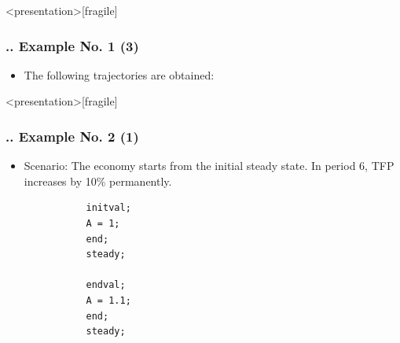 \documentclass[11pt,aspectratio=169]{beamer}
\begin{document}
\begin{frame}<presentation>[fragile]
	\frametitle{{\thesection.\thesubsection.\thesubsubsection} Example No. 1 (3)}
	\begin{itemize}
		\item The following trajectories are obtained:
		\begin{figure}
			\centering
			\qquad
			\qquad
		\end{figure}
	\end{itemize}
\end{frame}
\begin{frame}<presentation>[fragile]
	\frametitle{{\thesection.\thesubsection.\thesubsubsection} Example No. 2 (1)}
	\begin{itemize}
		\item Scenario: The economy starts from the initial steady state. In period 6, TFP increases by 10\% permanently. 
		\begin{verbatim}
		   initval;
		   A = 1;
		   end; 
		   steady;
		
		   endval;
		   A = 1.1;
		   end;
		   steady;
		\end{verbatim}
	\end{itemize}
\end{frame}
\end{document}
